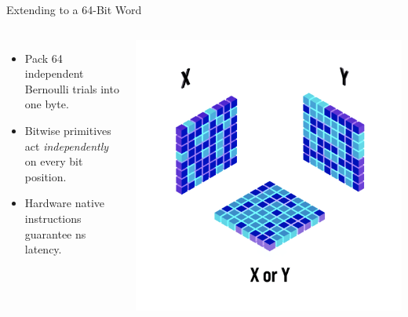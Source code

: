 \begin{frame}{Extending to a 64-Bit Word}
\begin{columns}
    \begin{itemize}
      \item Pack 64 independent Bernoulli trials into one byte.
      \item Bitwise primitives act \emph{independently} on every bit position.
      \item Hardware native instructions guarantee ns latency.
    \end{itemize}
    \centering
    \includegraphics[height=0.7\textheight]{2_framework/research_objective_2_sycl_eval/bitwise_xy_inv.png}
\end{columns}
\end{frame}





